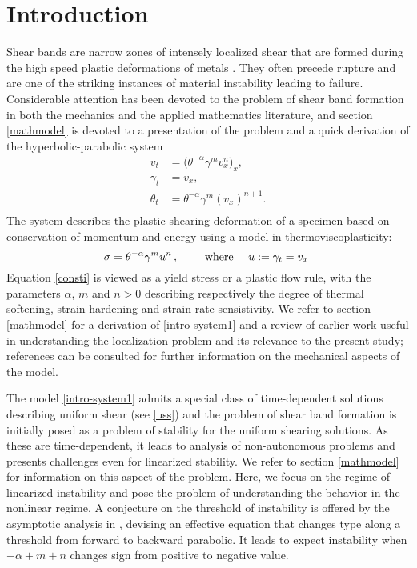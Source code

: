 \documentclass[usletter,11pt]{article}
\theoremstyle{remark}
\begin{document}
\section{Introduction}
Shear bands are narrow zones of intensely localized shear that are formed during the high speed plastic deformations of metals \cite{ZH, clifton_rev_1990,wright_survey_2002}. 
They often precede rupture and are one of the striking instances of material instability leading to failure.  Considerable attention has been devoted to the
problem of shear band formation in both the mechanics and the applied mathematics literature, and section \ref{mathmodel} is devoted
to a presentation of the problem and a quick derivation of the hyperbolic-parabolic system
\begin{equation} 
\label{intro-system1}
\begin{aligned}
v_t &= \big ( \theta^{-\alpha}\gamma^m v_x^n \big )_{x} , \\
 \gamma_t &= v_x ,\\
 \theta_t &= \theta^{-\alpha}\gamma^m (v_x)^{n+1} .\\
\end{aligned}
\end{equation}
The system describes the plastic shearing deformation of a specimen based on conservation of momentum and energy using
a model in thermoviscoplasticity: 
\begin{equation}
\label{consti}
\sigma =\theta^{-\alpha}\gamma^m u^n \, , \qquad \mbox{ where \quad $u := \gamma_t = v_x$ }		%
\end{equation}
Equation \eqref{consti} is viewed as a yield stress or a plastic flow rule, with the parameters $\alpha$, $m$ and $n > 0$ describing respectively the
degree of thermal softening, strain hardening and strain-rate sensistivity.
We refer to section \ref{mathmodel} for a derivation of  \eqref{intro-system1} and a review of earlier work useful in understanding 
the localization problem and its relevance to the present study; references \cite{clifton_rev_1990,shawki_shear_1989,wright_survey_2002,KT09} 
can be consulted for further information on the mechanical aspects of the model.


The model \eqref{intro-system1} admits a special class of time-dependent solutions describing uniform shear (see \eqref{uss}) and the problem
of shear band formation is initially posed as a problem of stability for the uniform shearing solutions. As these are time-dependent, it leads to 
analysis of non-autonomous problems and presents challenges even for linearized stability. We refer to section \ref{mathmodel}
for information on this aspect of the problem. Here, we focus on the regime of linearized instability and pose the problem of
understanding the behavior in the nonlinear regime.  A conjecture on the threshold of instability is offered by the asymptotic analysis in  \cite{KT09}, 
devising an effective equation that changes type along a threshold from forward to backward parabolic.
 It leads to expect instability when $-\alpha+m+n$ changes sign from positive to negative value.
 
\end{document}
